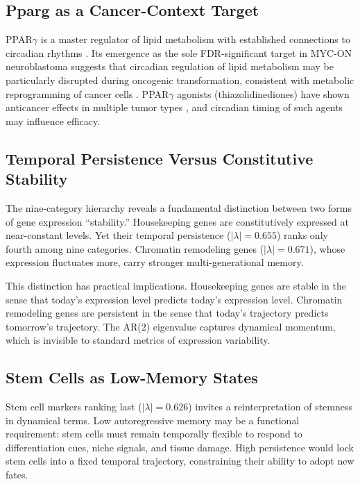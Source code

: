 \documentclass[11pt,a4paper]{article}
\begin{document}
\subsection{Pparg as a Cancer-Context Target}

PPAR$\gamma$ is a master regulator of lipid metabolism with established connections to circadian rhythms \citep{wang2008, yang2006}. Its emergence as the sole FDR-significant target in MYC-ON neuroblastoma suggests that circadian regulation of lipid metabolism may be particularly disrupted during oncogenic transformation, consistent with metabolic reprogramming of cancer cells \citep{hanahan2011, pavlova2016}. PPAR$\gamma$ agonists (thiazolidinediones) have shown anticancer effects in multiple tumor types \citep{michalik2004}, and circadian timing of such agents may influence efficacy.

\subsection{Temporal Persistence Versus Constitutive Stability}

The nine-category hierarchy reveals a fundamental distinction between two forms of gene expression ``stability.'' Housekeeping genes are constitutively expressed at near-constant levels. Yet their temporal persistence ($|\lambda| = 0.655$) ranks only fourth among nine categories. Chromatin remodeling genes ($|\lambda| = 0.671$), whose expression fluctuates more, carry stronger multi-generational memory.

This distinction has practical implications. Housekeeping genes are stable in the sense that today's expression level predicts today's expression level. Chromatin remodeling genes are persistent in the sense that today's trajectory predicts tomorrow's trajectory. The AR(2) eigenvalue captures dynamical momentum, which is invisible to standard metrics of expression variability.

\subsection{Stem Cells as Low-Memory States}

Stem cell markers ranking last ($|\lambda| = 0.626$) invites a reinterpretation of stemness in dynamical terms. Low autoregressive memory may be a functional requirement: stem cells must remain temporally flexible to respond to differentiation cues, niche signals, and tissue damage. High persistence would lock stem cells into a fixed temporal trajectory, constraining their ability to adopt new fates.
\end{document}
